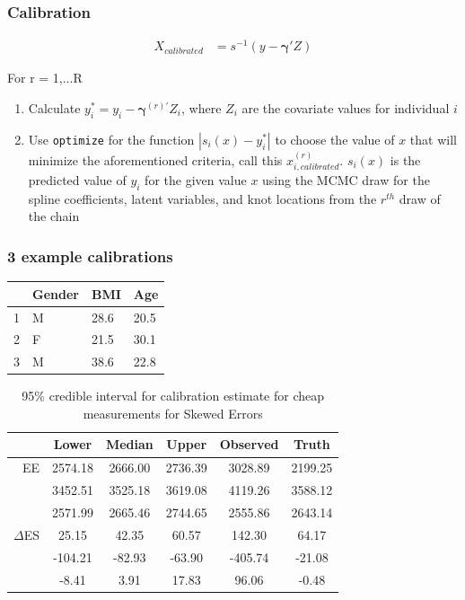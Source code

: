 \documentclass[handout]{beamer}\usepackage[]{graphicx}\usepackage[]{color}
\begin{document}
\begin{frame}
\frametitle{Calibration}

\begin{align*}
  X_{calibrated} &= s^{-1}(y-\boldsymbol{\gamma}' Z) 
\end{align*}

\vspace{0.3cm}

For r = 1,...R
\begin{enumerate}
\item
Calculate $y_i^* = y_i- \boldsymbol{\gamma}^{(r)'} Z_i$, where $Z_i$ are the covariate values for individual $i$
\item
Use \texttt{optimize} for the function $|s_i(x) - y_i^*|$ to choose the value of $x$ that will minimize the aforementioned criteria, call this $x_{i,calibrated}^{(r)}$. $s_i(x)$ is the predicted value of $y_i$ for the given value $x$ using the MCMC draw for the spline coefficients, latent variables, and knot locations from the $r^{th}$ draw of the chain

\end{enumerate}


\end{frame}

\begin{frame}
\frametitle{3 example calibrations}

\begin{table}
\begin{tabular}{l|lll}
\hline
 & Gender & BMI & Age \\
 \hline
 1 & M & 28.6 & 20.5 \\
 2 & F & 21.5 & 30.1 \\
 3 & M & 38.6 & 22.8 \\
 \hline
 \end{tabular}
 \end{table}

\begin{table}[ht]
\centering
\begin{tabular}{r|ccc|cc}
  \hline
& Lower & Median & Upper & Observed & Truth \\ 
  \hline
EE & 2574.18 & 2666.00 & 2736.39 & 3028.89 & 2199.25 \\ 
  & 3452.51 & 3525.18 & 3619.08 & 4119.26 & 3588.12 \\ 
  & 2571.99 & 2665.46 & 2744.65 & 2555.86 & 2643.14 \\ 
   \hline  
   $\Delta$ES & 25.15 & 42.35 & 60.57 & 142.30 & 64.17 \\ 
  & -104.21 & -82.93 & -63.90 & -405.74 & -21.08 \\ 
  & -8.41 & 3.91 & 17.83 & 96.06 & -0.48 \\ 
   \hline
\end{tabular}
\caption{95\% credible interval for calibration estimate for cheap measurements for Skewed Errors} 
\label{calibratedee}
\end{table}

\end{frame}
\end{document}
